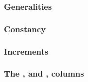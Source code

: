 \subsubsection{Generalities}                                                                 \label{hub: system: hub stamp: generalities}                 
\subsubsection{Constancy}                                                                    \label{hub: system: hub stamp: constancy}                    
\subsubsection{Increments}                                                                   \label{hub: system: hub stamp: increments}                   
\subsubsection{The \tli, \tliCounter{} and \nonStackRows, \nonStackRowsCounter{} columns}    \label{hub: system: hub stamp: counters}                     
